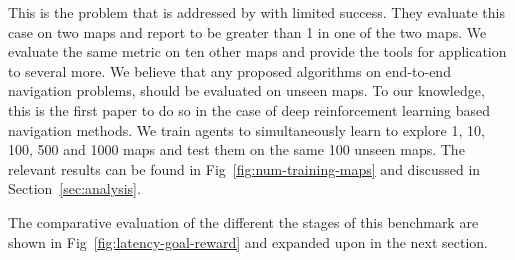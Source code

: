 \begin{description}
  This is the problem that is addressed by \cite{MiPaViICLR2017} with limited success. 
  They evaluate this case on two maps and report \LatencyOneGtOne{} to be greater than 1 in one of the two maps. We evaluate the same metric on ten other maps and provide the tools for application to several more.
    We believe that any proposed algorithms on end-to-end navigation problems, should be evaluated on unseen maps.
    To our knowledge, this is the first paper to do so in the case of deep reinforcement learning based navigation methods.
    We train agents to simultaneously learn to explore 1, 10, 100, 500 and 1000 maps and test them on the same 100 unseen maps. The relevant results can be found in Fig~\ref{fig:num-training-maps} and discussed in Section~\ref{sec:analysis}. 
\end{description}

The comparative evaluation of the different the stages of this benchmark are shown in Fig~\ref{fig:latency-goal-reward} and expanded upon in the next section.

%
%        

